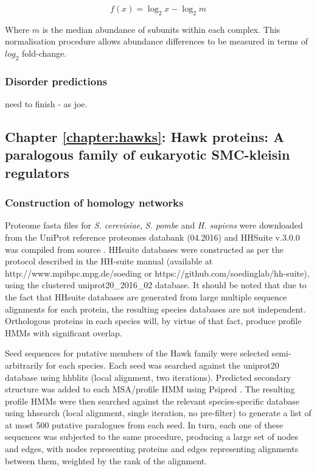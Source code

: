 \documentclass[a4paper,11pt,twoside,openright]{scrbook}
\begin{document}
\begin{displaymath}
    f(x) = \log_2 x - \log_2 m
\end{displaymath}

Where $m$ is the median abundance of subunits within each complex. This normalisation procedure allows abundance differences to be measured in terms of $log_{2}$ fold-change.

\subsubsection{Disorder predictions}
need to finish - as joe.


\subsection{Chapter \ref*{chapter:hawks}: Hawk proteins: A paralogous family of eukaryotic SMC-kleisin regulators}\label{subsection:hawkmethods}

\subsubsection{Construction of homology networks}
Proteome fasta files for \textit{S. cerevisiae}, \textit{S. pombe} and \textit{H. sapiens} were downloaded from the UniProt reference proteomes databank \cite{Consortium2017} (04.2016) and HHSuite v.3.0.0 was compiled from source \cite{Soding2005,Remmert2011}. HHsuite databases were constructed as per the protocol described in the HH-suite manual (available at http://www.mpibpc.mpg.de/soeding or https://github.com/soedinglab/hh-suite), using the clustered uniprot20\_2016\_02 database. It should be noted that due to the fact that HHsuite databases are generated from large multiple sequence alignments for each protein, the resulting species databases are not independent. Orthologous proteins in each species will, by virtue of that fact, produce profile HMMs with significant overlap.

Seed sequences for putative members of the Hawk family were selected semi-arbitrarily for each species. Each seed was searched against the uniprot20 database using hhblits \cite{Remmert2011} (local alignment, two iterations). Predicted secondary structure was added to each MSA/profile HMM using Psipred \cite{Jones1999}. The resulting profile HMMs were then searched against the relevant species-specific database using hhsearch (local alignment, single iteration, no pre-filter) to generate a list of at most 500 putative paralogues from each seed. In turn, each one of these sequences was subjected to the same procedure, producing a large set of nodes and edges, with nodes representing proteins and edges representing alignments between them, weighted by the rank of the alignment.
\end{document}
